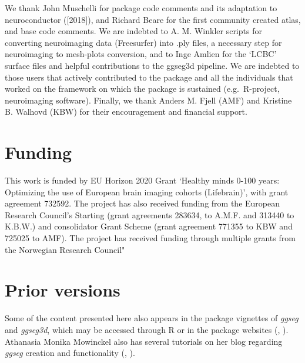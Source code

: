 \documentclass[fleqn,10pt]{wlpeerj} %
\begin{document}
We thank John Muschelli for package code comments and its adaptation to neuroconductor ({[}2018{]}), and Richard Beare for the first community created atlas, and base code comments.
We are indebted to A. M. Winkler scripts for converting neuroimaging data (Freesurfer) into .ply files, a necessary step for neuroimaging to mesh-plots conversion, and to Inge Amlien for the `LCBC' surface files and helpful contributions to the ggseg3d pipeline.
We are indebted to those users that actively contributed to the package and all the individuals that worked on the framework on which the package is sustained (e.g.~R-project, neuroimaging software).
Finally, we thank Anders M. Fjell (AMF) and Kristine B. Walhovd (KBW) for their encouragement and financial support.

\hypertarget{funding}{%
\section{Funding}\label{funding}}

This work is funded by EU Horizon 2020 Grant `Healthy minds 0-100 years: Optimizing the use of European brain imaging cohorts (Lifebrain)', with grant agreement 732592.
The project has also received funding from the European Research Council's Starting (grant agreements 283634, to A.M.F. and 313440 to K.B.W.) and consolidator Grant Scheme (grant agreement 771355 to KBW and 725025 to AMF).
The project has received funding through multiple grants from the Norwegian Research Council"

\hypertarget{prior-versions}{%
\section{Prior versions}\label{prior-versions}}

Some of the content presented here also appears in the package vignettes of \emph{ggseg} and \emph{ggseg3d}, which may be accessed through R or in the package websites (\citet{ggseg}, \citet{ggseg3d}).
Athanasia Monika Mowinckel also has several tutorials on her blog regarding \emph{ggseg} creation and functionality (\citet{ggsegAnim}, \citet{ggsegIntro}).

\renewcommand\refname{References}

\end{document}
